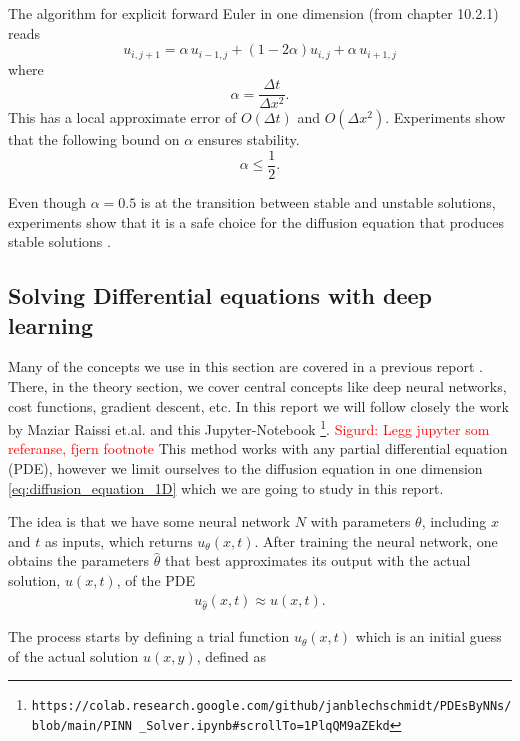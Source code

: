 \documentclass[12pt]{extarticle}
\begin{document}
The algorithm for explicit forward Euler in one dimension (from \cite{lectures2015} chapter 10.2.1) reads
\begin{equation}
\label{eq:forward_euler}
u_{i, j+1} = \alpha\, u_{i-1, j} + (1 - 2\alpha) u_{i,j} + \alpha\, u_{i+1, j}
\end{equation}
where
\begin{equation}
\alpha = \frac{\Delta t}{\Delta x^2}.
\end{equation}
This has a local approximate error of $O(\Delta t)$ and $O(\Delta x ^2)$. Experiments show that the following bound on $\alpha$ ensures stability.
\begin{equation}
	\label{eq:stability}
	\alpha \le \frac{1}{2}.
\end{equation} 

Even though $\alpha = 0.5$ is at the transition between stable and unstable solutions, experiments show that it is a safe choice for the diffusion equation that produces stable solutions \cite{Linge2017}. 

\subsection{Solving Differential equations with deep learning}
Many of the concepts we use in this section are covered in a previous report \cite{project2}. There, in the theory section, we cover central concepts like deep neural networks, cost functions, gradient descent, etc. In this report we will follow closely the work by Maziar Raissi et.al. \cite{raissi2017physics} and this Jupyter-Notebook \footnote{\texttt{https://colab.research.google.com/github/janblechschmidt/PDEsByNNs/blob/main/PINN \_Solver.ipynb\#scrollTo=1PlqQM9aZEkd}}. \textcolor{red}{Sigurd: Legg jupyter som referanse, fjern footnote} This method works with any partial differential equation (PDE), however we limit ourselves to the diffusion equation in one dimension \eqref{eq:diffusion_equation_1D} which we are going to study in this report. 

The idea is that we have some neural network $N$ with parameters $\theta$, including $x$ and $t$ as inputs, which returns $u_{\theta}(x,t)$. After training the neural network, one obtains the parameters $\hat{\theta}$ that best approximates its output with the actual solution, $u(x,t)$, of the PDE
\begin{align}
	u_{\hat{\theta}} (x, t) \approx u(x, t).
\end{align}

The process starts by defining a trial function $u_{\theta}(x,t)$ which is an initial guess of the actual solution $u(x,y)$, defined as
\end{document}

